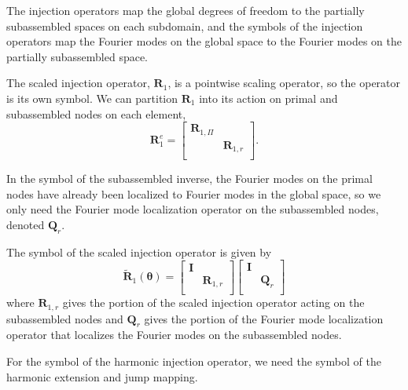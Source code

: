 The injection operators map the global degrees of freedom to the partially subassembled spaces on each subdomain, and the symbols of the injection operators map the Fourier modes on the global space to the Fourier modes on the partially subassembled space.

The scaled injection operator, $\mathbf{R}_1$, is a pointwise scaling operator, so the operator is its own symbol.
We can partition $\mathbf{R}_1$ into its action on primal and subassembled nodes on each element,
\begin{equation}
\mathbf{R}_1^e =
\begin{bmatrix}
\mathbf{R}_{1, \Pi} &                    \\
                    & \mathbf{R}_{1, r}  \\
\end{bmatrix}.
\end{equation}

In the symbol of the subassembled inverse, the Fourier modes on the primal nodes have already been localized to Fourier modes in the global space, so we only need the Fourier mode localization operator on the subassembled nodes, denoted $\mathbf{Q}_r$.

\begin{definition}
The symbol of the scaled injection operator is given by
\begin{equation}
\tilde{\mathbf{R}}_1 \left( \boldsymbol{\theta} \right) =
\begin{bmatrix}
\mathbf{I} &                    \\
           & \mathbf{R}_{1, r}  \\
\end{bmatrix}
\begin{bmatrix}
\mathbf{I} &                 \\
           & \mathbf{Q}_{r}  \\
\end{bmatrix}
\end{equation}
where $\mathbf{R}_{1, r}$ gives the portion of the scaled injection operator acting on the subassembled nodes and $\mathbf{Q}_r$ gives the portion of the Fourier mode localization operator that localizes the Fourier modes on the subassembled nodes.
\label{def:scaled_injection_symbol}
\end{definition}

For the symbol of the harmonic injection operator, we need the symbol of the harmonic extension and jump mapping.

